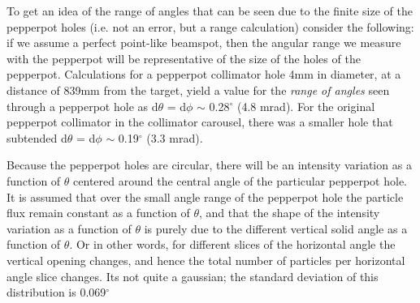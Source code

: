 \documentclass[11pt]{report}
\begin{document}
To get an idea of the range of angles that can be seen due to the finite size
of the pepperpot holes
(i.e. not an error, but a range calculation) 
consider the following:
if we assume a perfect point-like beamspot, then the angular range we measure with the pepperpot will be
representative of the size of the holes of the pepperpot.
Calculations for a pepperpot collimator hole 4mm in diameter, at a distance of 839mm from the target, 
yield a value for the {\it range of angles} seen through a pepperpot hole as d$\theta$ = d$\phi$ $\sim$ 0.28$^{\circ}$ (4.8 mrad). 
For the original pepperpot collimator in the collimator carousel, there was
a smaller hole that subtended d$\theta$ = d$\phi$ $\sim$ 0.19$^{\circ}$ (3.3 mrad).
%

Because the pepperpot holes are circular, there will be an intensity variation as a function of $\theta$ centered
around the central angle of the particular pepperpot hole. 
It is assumed that over the small angle range of the pepperpot hole the particle flux remain constant
as a function of $\theta$, and that the shape of the intensity variation as a function of 
$\theta$ is purely due to the different vertical solid angle as a function of $\theta$. Or in other words, for 
different slices of the horizontal angle the vertical opening changes, and hence the total number of particles per horizontal
angle slice changes. Its not quite a gaussian; the standard deviation of this distribution is 
0.069$^{\circ}$ %
\end{document}
